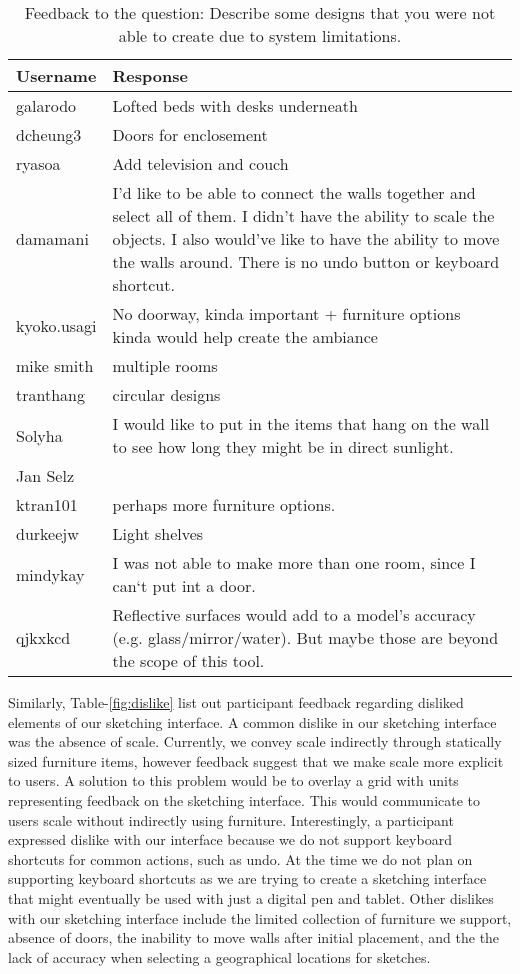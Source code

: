 \begin{table}[!ht]
\centering
\begin{tabular}{|p{}|p{}|}
\hline
\rowcolor[HTML]{EFEFEF} 
\textbf{Username} & \textbf{Response} \\ \hline
galarodo & Lofted beds with desks underneath \\ \hline
dcheung3 & Doors for enclosement \\ \hline
ryasoa & Add television and couch \\ \hline
damamani & I'd like to be able to connect the walls together and select all of them. I didn't have the ability to scale the objects.  I also would've like to have the ability to move the walls around. There is no undo button or keyboard shortcut. \\ \hline
kyoko.usagi & No doorway, kinda important + furniture options kinda would help create the ambiance \\ \hline
mike smith & multiple rooms \\ \hline
tranthang & circular designs \\ \hline
Solyha & I would like to put in the items that hang on the wall to see how long they might be in direct sunlight. \\ \hline
Jan Selz &  \\ \hline
ktran101 & perhaps more furniture options. \\ \hline
durkeejw & Light shelves \\ \hline
mindykay & I was not able to make more than one room, since I can`t put int a door. \\ \hline
qjkxkcd & Reflective surfaces would add to a model's accuracy (e.g. glass/mirror/water). But maybe those are beyond the scope of this tool. \\ \hline
\end{tabular}
\caption{Feedback to the question: Describe some designs that you were not able to create due  to system limitations. }
\label{fig:limitation}
\end{table}




Similarly, Table-\ref{fig:dislike} list out participant feedback regarding disliked elements of our sketching interface.
A common dislike in our sketching interface was the absence of scale.
Currently, we convey scale indirectly through statically sized furniture items, however feedback suggest that we make scale more explicit to users.
A solution to this problem would be to overlay a grid with units representing feedback on the sketching interface. This would communicate to users scale without indirectly using furniture.
Interestingly, a participant expressed dislike with our interface because we do not support keyboard shortcuts for common actions, such as undo.
At the time we do not plan on supporting keyboard shortcuts as we are trying to create a sketching interface that might eventually be used with just a digital pen and tablet.
Other dislikes with our sketching interface include the limited collection of furniture we support, absence of doors, the inability to move walls after initial placement, and the the lack of accuracy when selecting a geographical locations for sketches.

